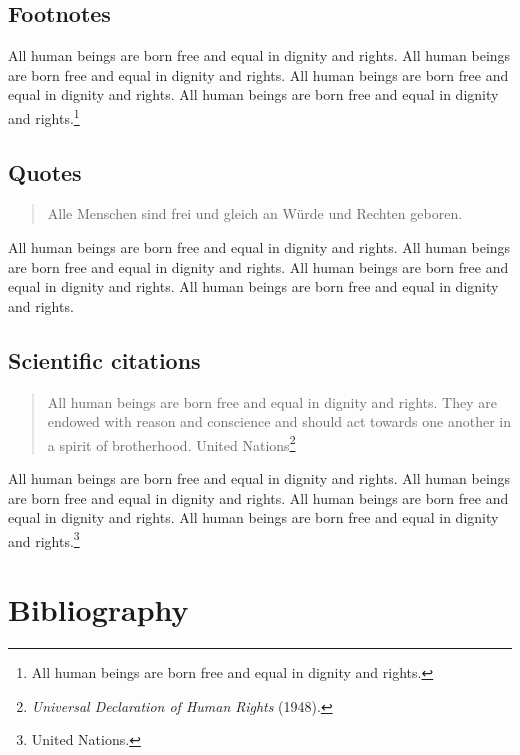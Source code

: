 \documentclass[
  ngerman,
  american,
  letterpaper,
  DIV=11,
  numbers=noendperiod]{scrartcl}
\begin{document}
\subsection{Footnotes}\label{footnotes}

All human beings are born free and equal in dignity and rights. All
human beings are born free and equal in dignity and rights. All human
beings are born free and equal in dignity and rights. All human beings
are born free and equal in dignity and rights.\footnote{All human beings
  are born free and equal in dignity and rights.}

\subsection{Quotes}\label{quotes}

\begin{otherlanguage}{ngerman}

\begin{quote}
Alle Menschen sind frei und gleich an Würde und Rechten geboren.
\end{quote}

\end{otherlanguage}

All human beings are born free and equal in dignity and rights. All
human beings are born free and equal in dignity and rights. All human
beings are born free and equal in dignity and rights. All human beings
are born free and equal in dignity and rights.

\subsection{Scientific citations}\label{scientific-citations}

\begin{quote}
All human beings are born free and equal in dignity and rights. They are
endowed with reason and conscience and should act towards one another in
a spirit of brotherhood. United Nations\footnote{\emph{Universal
  Declaration of Human Rights} (1948).}
\end{quote}

All human beings are born free and equal in dignity and rights. All
human beings are born free and equal in dignity and rights. All human
beings are born free and equal in dignity and rights. All human beings
are born free and equal in dignity and rights.\footnote{United Nations.}

\section{Bibliography}\label{bibliography}
\end{document}
